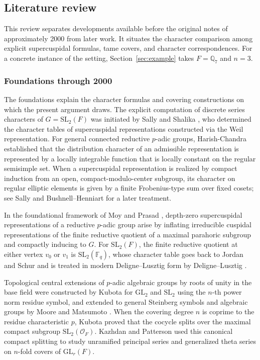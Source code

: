 \documentclass[12pt, letterpaper]{article}
\numberwithin{equation}{section}
\theoremstyle{definition}
\theoremstyle{remark}
\newcommand{\OO}{\mathcal{O}_F}
\newcommand{\kk}{\mathbb{F}_q}
\newcommand{\Gbar}{\mathrm{SL}_2(\kk)}
\newcommand{\G}{\mathrm{SL}_2(F)}
\begin{document}
\subsection{Literature review}\label{sec:lit-review}

This review separates developments available before the original notes of approximately 2000 from later work. It situates the character comparison among explicit supercuspidal formulas, tame covers, and character correspondences. For a concrete instance of the setting, Section~\ref{sec:example} takes $F=\mathbb{Q}_7$ and $n=3$.

\subsubsection{Foundations through 2000}

The foundations explain the character formulas and covering constructions on which the present argument draws. The explicit computation of discrete series characters of $G=\G$ was initiated by Sally and Shalika \cite{SS68}, who determined the character tables of supercuspidal representations constructed via the Weil representation. For general connected reductive $p$-adic groups, Harish-Chandra established that the distribution character of an admissible representation is represented by a locally integrable function that is locally constant on the regular semisimple set. When a supercuspidal representation is realized by compact induction from an open, compact-modulo-center subgroup, its character on regular elliptic elements is given by a finite Frobenius-type sum over fixed cosets; see Sally \cite[Thm.~1.9 and Eq.~(1.10)]{Sa88} and Bushnell--Henniart \cite[Appendix~A, \S A.3, Thm.~A.4]{BH06} for a later treatment.

In the foundational framework of Moy and Prasad \cite{MP94,MP96}, depth-zero supercuspidal representations of a reductive $p$-adic group arise by inflating irreducible cuspidal representations of the finite reductive quotient of a maximal parahoric subgroup and compactly inducing to $G$. For $\G$, the finite reductive quotient at either vertex $v_0$ or $v_1$ is $\Gbar$, whose character table goes back to Jordan and Schur and is treated in modern Deligne--Lusztig form by Deligne--Lusztig \cite{DL76}.

Topological central extensions of $p$-adic algebraic groups by roots of unity in the base field were constructed by Kubota \cite{Ku67} for $\mathrm{GL}_2$ and $\mathrm{SL}_2$ using the $n$-th power norm residue symbol, and extended to general Steinberg symbols and algebraic groups by Moore \cite{Mo68} and Matsumoto \cite{Ma69}. When the covering degree $n$ is coprime to the residue characteristic $p$, Kubota proved that the cocycle splits over the maximal compact subgroup $\mathrm{SL}_2(\OO)$. Kazhdan and Patterson \cite{KP84} used this canonical compact splitting to study unramified principal series and generalized theta series on $n$-fold covers of $\mathrm{GL}_r(F)$.
\end{document}
